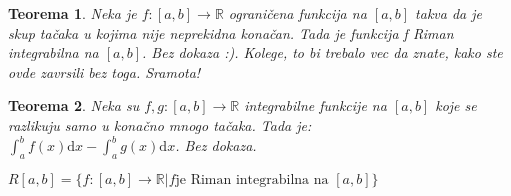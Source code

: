 \documentclass{article}
\newtheorem{teorema}{Teorema}[section]
\begin{document}
\begin{teoremabox}
    \begin{teorema}
        Neka je $f:[a, b] \rightarrow \mathbb{R}$ ograničena funkcija na $[a, b]$ takva da je skup tačaka u kojima nije neprekidna konačan. Tada je funkcija f Riman integrabilna na $[a, b]$. Bez dokaza :). Kolege, to bi trebalo vec da znate, kako ste ovde zavrsili bez toga. Sramota!
    \end{teorema}
\end{teoremabox}
\begin{teoremabox}
    \begin{teorema}
        Neka su $f, g: [a, b] \rightarrow \mathbb{R}$ integrabilne funkcije na $[a, b]$ koje se razlikuju samo u konačno mnogo tačaka. Tada je:\\
        $\displaystyle \int_a^b f(x)\text{d}x - \int_a^b g(x)\text{d}x$. Bez dokaza.
    \end{teorema}
\end{teoremabox}
$R[a, b] = \{f:[a, b] \rightarrow \mathbb{R} | f \text{je Riman integrabilna na } [a, b]\}$
\end{document}
